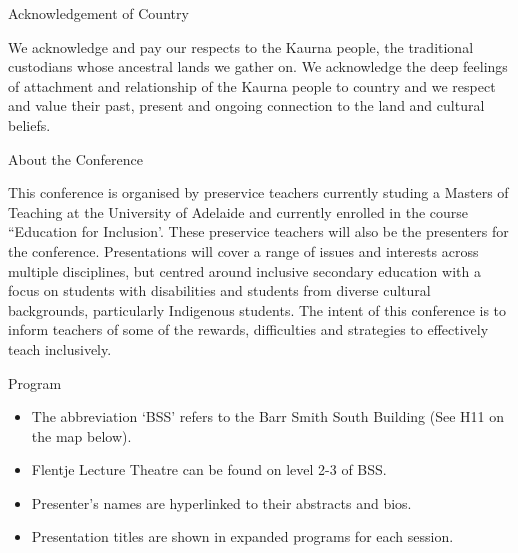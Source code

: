 \documentclass[twoside,12pt,a4paper,notitlepage]{memoir}
\begin{document}
\pagestyle{plain}



\setcounter{tocdepth}{2}
\tableofcontents
\vfill

\clearpage{}
\vspace*{2cm}
{\Huge Acknowledgement of Country}
\vspace{2cm}

We acknowledge and pay our respects to the Kaurna people, the traditional custodians whose ancestral lands we gather on. We acknowledge the deep feelings of attachment and relationship of the Kaurna people to country and we respect and value their past, present and ongoing connection to the land and cultural beliefs.
\vfill

\clearpage{}
\vspace*{2cm}
{\Huge About the Conference}
\vspace{2cm}

This conference is organised by preservice teachers currently studing a Masters of Teaching at the University of Adelaide and currently enrolled in the course ``Education for Inclusion'. These preservice teachers will also be the presenters for the conference. Presentations will cover a range of issues and interests across multiple disciplines, but centred around inclusive secondary education with a focus on students with disabilities and students from diverse cultural backgrounds, particularly Indigenous students. The intent of this conference is to inform teachers of some of the rewards, difficulties and strategies to effectively teach inclusively. 
\vfill




\clearpage{}
\vspace*{2cm}
{\Huge Program}
\vspace{2cm}

\begin{itemize}
	\item The abbreviation `BSS' refers to the Barr Smith South Building (See H11 on the map below).
	\item Flentje Lecture Theatre can be found on level 2-3 of BSS.
	\item Presenter's names are hyperlinked to their abstracts and bios.
	\item Presentation titles are shown in expanded programs for each session.
\end{itemize}
\end{document}
